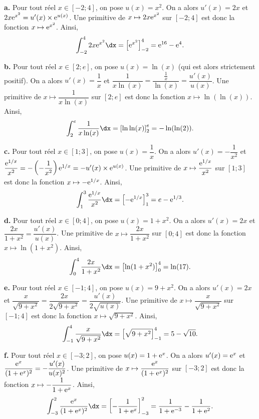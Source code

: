 \documentclass[11pt,fleqn, openany]{book} %
\begin{document}
 \begin{solution}

\textbf{a.} Pour tout réel \(x \in [-2;4]\), on pose \(u(x)=x^2\). On a alors \(u'(x)=2x\) et \(2x\mathrm{e}^{x^2} = u'(x) \times \mathrm{e}^{u(x)}\). Une primitive de \(x\mapsto 2x\mathrm{e}^{x^2}\) sur \([-2;4]\) est donc la fonction \(x \mapsto \mathrm{e}^{x^2}\). Ainsi, \[\displaystyle\int_{-2}^4 2x\e^{x^2} \dx=\left[\e^{x^2}\right]_{-2}^4=\e^{16}-\e^4.\]

\textbf{b.} Pour tout réel \(x \in [2;e]\), on pose \(u(x)=\ln(x)\) (qui est alors strictement positif). On a alors \(u'(x)=\dfrac{1}{x}\) et \(\dfrac{1}{x\ln(x)} = \dfrac{\frac{1}{x}}{\ln(x)} = \dfrac{u'(x)}{u(x)}\). Une primitive de \(x\mapsto \dfrac{1}{x\ln(x)}\) sur \([2;e]\) est donc la fonction \(x \mapsto \ln(\ln(x))\). Ainsi, \[\displaystyle\int_{2}^e \dfrac{1}{x\ln(x)} \dx=\left[\ln \ln (x)\right]_{2}^e=-\ln(\ln(2)).\]

\textbf{c.} Pour tout réel \(x \in [1;3]\), on pose \(u(x)=\dfrac{1}{x}\). On a alors \(u'(x)=-\dfrac{1}{x^2}\) et \(\dfrac{\mathrm{e}^{1/x}}{x^2} = - \left(-\dfrac{1}{x^2}\right)\mathrm{e}^{1/x} = -u'(x) \times \mathrm{e}^{u(x)}\). Une primitive de \(x\mapsto \dfrac{\mathrm{e}^{1/x}}{x^2}\) sur \([1;3]\) est donc la fonction \(x \mapsto -\mathrm{e}^{1/x}\). Ainsi, \[\displaystyle\int_{1}^{3} \dfrac{\e^{1/x}}{x^2} \dx=\left[-\e^{1/x}\right]_{1}^3=e-\e^{1/3}.\]

\textbf{d.} Pour tout réel \(x \in [0;4]\), on pose \(u(x)=1+x^2\). On a alors \(u'(x)=2x\) et \(\dfrac{2x}{1+x^2} = \dfrac{u'(x)}{u(x)}\). Une primitive de \(x\mapsto \dfrac{2x}{1+x^2}\) sur \([0;4]\) est donc la fonction \(x \mapsto \ln (1+x^2)\). Ainsi, \[\displaystyle\int_{0}^{4} \dfrac{2x}{1+x^2} \dx=\left[\ln(1+x^2)\right]_0^4=\ln(17).\]

\textbf{e.} Pour tout réel \(x \in [-1;4]\), on pose \(u(x)=9+x^2\). On a alors \(u'(x)=2x\) et \(\dfrac{x}{\sqrt{9+x^2}}=\dfrac{2x}{2\sqrt{9+x^2}} = \dfrac{u'(x)}{2\sqrt{u(x)}}\). Une primitive de \(x\mapsto \dfrac{x}{\sqrt{9+x^2}}\) sur \([-1;4]\) est donc la fonction \(x \mapsto \sqrt{9+x^2}\). Ainsi, \[\displaystyle\int_{-1}^{4} \dfrac{x}{\sqrt{9+x^2}} \dx=\left[\sqrt{9+x^2}\right]_{-1}^4=5-\sqrt{10}.\]

\textbf{f.} Pour tout réel \(x \in [-3;2]\), on pose \(u(x)=1+\mathrm{e}^x\). On a alors \(u'(x)=\mathrm{e}^x\) et \(\dfrac{\mathrm{e}^x}{(1+\mathrm{e}^x)^2} = -\dfrac{u'(x)}{u(x)^2}\). Une primitive de \(x\mapsto \dfrac{\mathrm{e}^x}{(1+\mathrm{e}^x)^2}\) sur \([-3;2]\) est donc la fonction \(x \mapsto -\dfrac{1}{1+\mathrm{e}^x}\). Ainsi, \[\displaystyle\int_{-3}^{2} \dfrac{\e^x}{(1+\e^x)^2} \dx=\left[-\dfrac{1}{1+\e^x}\right]_{-3}^2=\dfrac{1}{1+\e^{-3}}-\dfrac{1}{1+\e^2}.\]
\end{solution}
\end{document}
